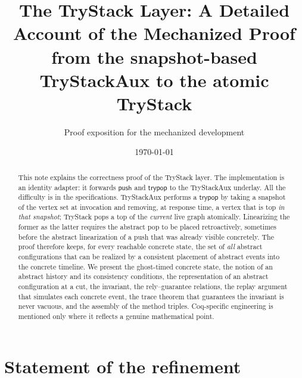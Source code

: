 \documentclass[11pt]{article}
\title{The TryStack Layer: A Detailed Account of the Mechanized Proof\\
  \large from the snapshot-based TryStackAux to the atomic TryStack}
\author{Proof exposition for the mechanized development}
\date{\today}
\theoremstyle{definition}
\theoremstyle{remark}
\newcommand{\Push}{\mathsf{push}}
\newcommand{\TryPop}{\mathsf{trypop}}
\begin{document}
\maketitle

\begin{abstract}
This note explains the correctness proof of the TryStack layer.  The
implementation is an identity adapter: it forwards \(\Push\) and \(\TryPop\)
to the TryStackAux underlay.  All the difficulty is in the specifications.
TryStackAux performs a \(\TryPop\) by taking a snapshot of the vertex set at
invocation and removing, at response time, a vertex that is top \emph{in that
snapshot}; TryStack pops a top of the \emph{current} live graph atomically.
Linearizing the former as the latter requires the abstract pop to be placed
retroactively, sometimes before the abstract linearization of a push that was
already visible concretely.  The proof therefore keeps, for every reachable
concrete state, the set of \emph{all} abstract configurations that can be
realized by a consistent placement of abstract events into the concrete
timeline.  We present the ghost-timed concrete state, the notion of an
abstract history and its consistency conditions, the representation of an
abstract configuration at a cut, the invariant, the rely--guarantee relations,
the replay argument that simulates each concrete event, the trace theorem
that guarantees the invariant is never vacuous, and the assembly of the
method triples.  Coq-specific engineering is mentioned only where it reflects
a genuine mathematical point.
\end{abstract}

\tableofcontents

\section{Statement of the refinement}
\end{document}
